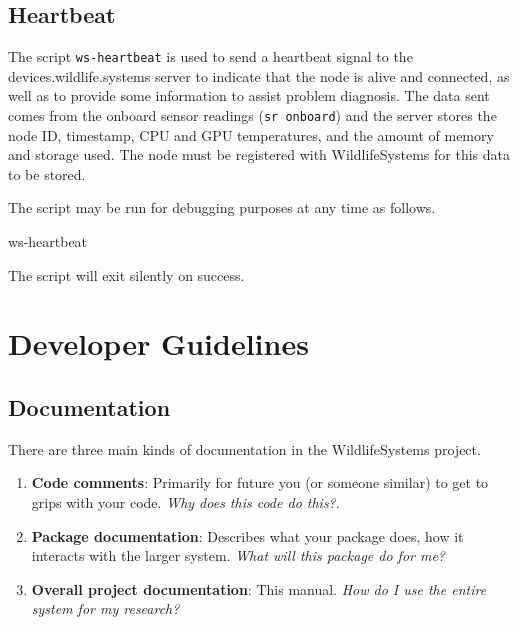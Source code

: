 \documentclass[
]{book}
\newenvironment{Shaded}{\begin{snugshade}}{\end{snugshade}}
\newcommand{\ExtensionTok}[1]{#1}
\begin{document}
\section{Heartbeat}\label{heartbeat}

The script \texttt{ws-heartbeat} is used to send a heartbeat signal to the devices.wildlife.systems server to indicate that the node is alive and connected, as well as to provide some information to assist problem diagnosis. The data sent comes from the onboard sensor readings (\texttt{sr\ onboard}) and the server stores the node ID, timestamp, CPU and GPU temperatures, and the amount of memory and storage used. The node must be registered with WildlifeSystems for this data to be stored.

The script may be run for debugging purposes at any time as follows.

\begin{Shaded}
\begin{Highlighting}[]
\ExtensionTok{ws{-}heartbeat}
\end{Highlighting}
\end{Shaded}

The script will exit silently on success.

\chapter{Developer Guidelines}\label{developer-guidelines}

\section{Documentation}\label{documentation}

There are three main kinds of documentation in the WildlifeSystems project.

\begin{enumerate}
\def\labelenumi{\arabic{enumi}.}
\item
  \textbf{Code comments}: Primarily for future you (or someone similar) to get to grips with your code. \emph{Why does this code do this?}.
\item
  \textbf{Package documentation}: Describes what your package does, how it interacts with the larger system. \emph{What will this package do for me?}
\item
  \textbf{Overall project documentation}: This manual. \emph{How do I use the entire system for my research?}
\end{enumerate}
\end{document}
